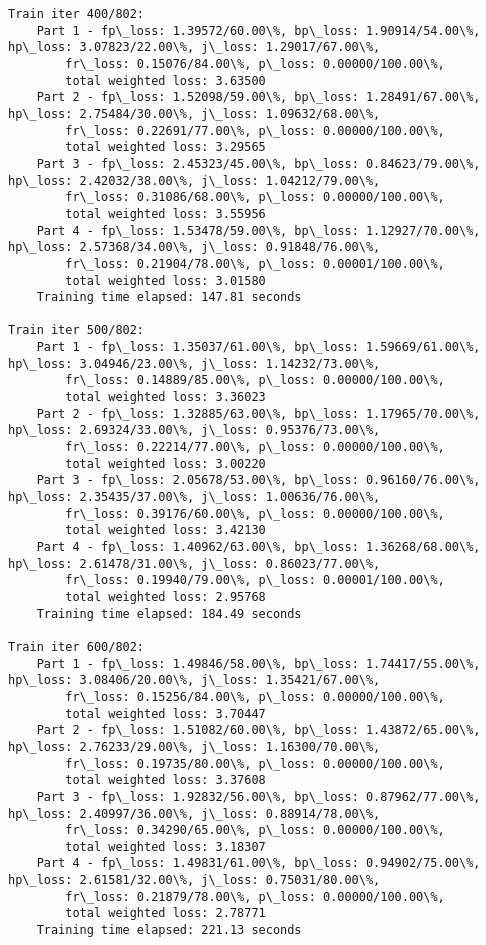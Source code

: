 \documentclass[11pt]{article}
\begin{document}
\begin{Verbatim}[commandchars=\\\{\}]
Train iter 400/802:
	Part 1 - fp\_loss: 1.39572/60.00\%, bp\_loss: 1.90914/54.00\%, hp\_loss: 3.07823/22.00\%, j\_loss: 1.29017/67.00\%, 
		fr\_loss: 0.15076/84.00\%, p\_loss: 0.00000/100.00\%, 
		total weighted loss: 3.63500
	Part 2 - fp\_loss: 1.52098/59.00\%, bp\_loss: 1.28491/67.00\%, hp\_loss: 2.75484/30.00\%, j\_loss: 1.09632/68.00\%, 
		fr\_loss: 0.22691/77.00\%, p\_loss: 0.00000/100.00\%, 
		total weighted loss: 3.29565
	Part 3 - fp\_loss: 2.45323/45.00\%, bp\_loss: 0.84623/79.00\%, hp\_loss: 2.42032/38.00\%, j\_loss: 1.04212/79.00\%, 
		fr\_loss: 0.31086/68.00\%, p\_loss: 0.00000/100.00\%, 
		total weighted loss: 3.55956
	Part 4 - fp\_loss: 1.53478/59.00\%, bp\_loss: 1.12927/70.00\%, hp\_loss: 2.57368/34.00\%, j\_loss: 0.91848/76.00\%, 
		fr\_loss: 0.21904/78.00\%, p\_loss: 0.00001/100.00\%, 
		total weighted loss: 3.01580
	Training time elapsed: 147.81 seconds

Train iter 500/802:
	Part 1 - fp\_loss: 1.35037/61.00\%, bp\_loss: 1.59669/61.00\%, hp\_loss: 3.04946/23.00\%, j\_loss: 1.14232/73.00\%, 
		fr\_loss: 0.14889/85.00\%, p\_loss: 0.00000/100.00\%, 
		total weighted loss: 3.36023
	Part 2 - fp\_loss: 1.32885/63.00\%, bp\_loss: 1.17965/70.00\%, hp\_loss: 2.69324/33.00\%, j\_loss: 0.95376/73.00\%, 
		fr\_loss: 0.22214/77.00\%, p\_loss: 0.00000/100.00\%, 
		total weighted loss: 3.00220
	Part 3 - fp\_loss: 2.05678/53.00\%, bp\_loss: 0.96160/76.00\%, hp\_loss: 2.35435/37.00\%, j\_loss: 1.00636/76.00\%, 
		fr\_loss: 0.39176/60.00\%, p\_loss: 0.00000/100.00\%, 
		total weighted loss: 3.42130
	Part 4 - fp\_loss: 1.40962/63.00\%, bp\_loss: 1.36268/68.00\%, hp\_loss: 2.61478/31.00\%, j\_loss: 0.86023/77.00\%, 
		fr\_loss: 0.19940/79.00\%, p\_loss: 0.00001/100.00\%, 
		total weighted loss: 2.95768
	Training time elapsed: 184.49 seconds

Train iter 600/802:
	Part 1 - fp\_loss: 1.49846/58.00\%, bp\_loss: 1.74417/55.00\%, hp\_loss: 3.08406/20.00\%, j\_loss: 1.35421/67.00\%, 
		fr\_loss: 0.15256/84.00\%, p\_loss: 0.00000/100.00\%, 
		total weighted loss: 3.70447
	Part 2 - fp\_loss: 1.51082/60.00\%, bp\_loss: 1.43872/65.00\%, hp\_loss: 2.76233/29.00\%, j\_loss: 1.16300/70.00\%, 
		fr\_loss: 0.19735/80.00\%, p\_loss: 0.00000/100.00\%, 
		total weighted loss: 3.37608
	Part 3 - fp\_loss: 1.92832/56.00\%, bp\_loss: 0.87962/77.00\%, hp\_loss: 2.40997/36.00\%, j\_loss: 0.88914/78.00\%, 
		fr\_loss: 0.34290/65.00\%, p\_loss: 0.00000/100.00\%, 
		total weighted loss: 3.18307
	Part 4 - fp\_loss: 1.49831/61.00\%, bp\_loss: 0.94902/75.00\%, hp\_loss: 2.61581/32.00\%, j\_loss: 0.75031/80.00\%, 
		fr\_loss: 0.21879/78.00\%, p\_loss: 0.00000/100.00\%, 
		total weighted loss: 2.78771
	Training time elapsed: 221.13 seconds


\end{Verbatim}
\end{document}

